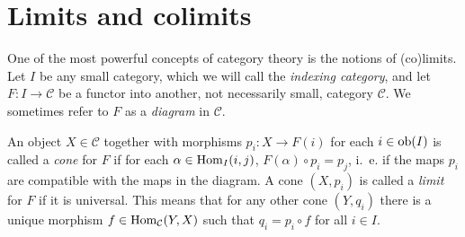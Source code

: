 \documentclass[a4paper,openany]{scrbook}
\renewcommand{\C}{\mathcal C}
\begin{document}

\section{Limits and colimits}\label{app:limits}

One of the most powerful concepts of category theory is the notions of (co)limits. Let $I$ be any small category, which we will call the \emph{indexing category}, and let $F\colon I \to \C$ be a functor into another, not necessarily small, category $\C$. We sometimes refer to $F$ as a \emph{diagram} in $\C$.

\begin{defn} An object $X \in \C$ together with morphisms $p_i\colon X \to F(i)$ for each $i \in \operatorname{ob}(I)$ is called a \emph{cone} for $F$ if for each $\alpha \in \operatorname{Hom}_I(i,j)$, $F(\alpha) \circ p_i = p_j$, i.~e. if the maps $p_i$ are compatible with the maps in the diagram. A cone $(X,p_i)$ is called a \emph{limit} for $F$ if it is universal. This means that for any other cone $(Y,q_i)$ there is a unique morphism $f \in \Hom_\C(Y,X)$ such that $q_i = p_i \circ f$ for all $i \in I$.
\end{defn}
\end{document}
